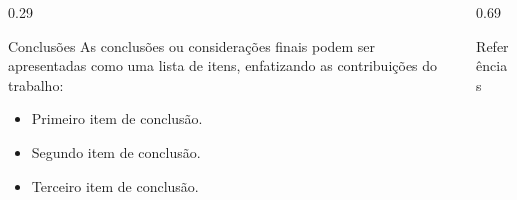 \documentclass[%
  t,%
  onlytextwidth,%
  compress,%
  xcolor = table,%
  english,%
  brazilian,%
]{beamer}
\begin{document}
\begin{frame}
\begin{columns}%
\begin{column}{0.29\textwidth}%
\begin{block}{Conclusões}%
As conclusões ou considerações finais podem ser apresentadas como uma lista de itens, enfatizando as contribuições do trabalho:
\begin{itemize}
\item Primeiro item de conclusão.
\item Segundo item de conclusão.
\item Terceiro item de conclusão.
\end{itemize}
\end{block}%
\end{column}%
\hfill%
\begin{column}{0.69\textwidth}%
\begin{block}{Referências}%
\printbibliography[heading = none]
\end{block}%
\end{column}%
\end{columns}%


\end{frame}
\end{document}
